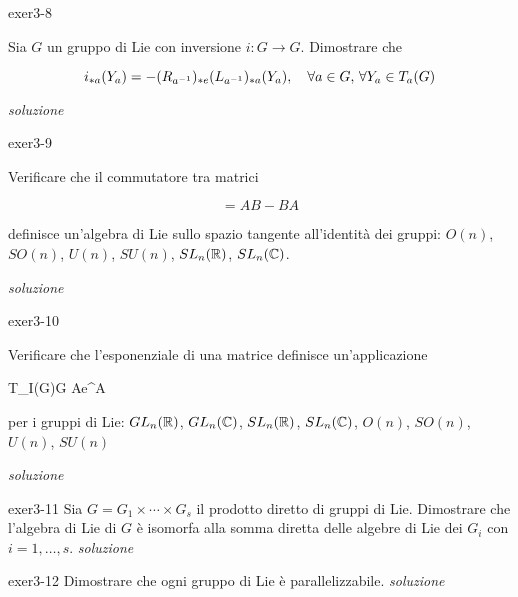 
{exer3-8}
{
Sia $ G $ un gruppo di Lie con inversione $ i : G \to G $. Dimostrare che

\begin{equation}
	i_{*a}(Y_{a}) = -(R_{a^{-1}})_{*e}(L_{a^{-1}})_{*a} (Y_{a}) %
	\qcomma \forall a \in G, \, \forall Y_{a} \in T_{a}(G)
\end{equation}
}
{
\textit{soluzione}
}


{exer3-9}
{
Verificare che il commutatore tra matrici

\begin{equation}
	[A,B] = AB - BA
\end{equation}

definisce un'algebra di Lie sullo spazio tangente all'identità dei gruppi: $ O(n) $, $ SO(n) $, $ U(n) $, $ SU(n) $, $ SL_{n}(\mathbb{R}) $, $ SL_{n}(\mathbb{C}) $.
}
{
\textit{soluzione}
}


{exer3-10}
{
Verificare che l'esponenziale di una matrice definisce un'applicazione

	{T_{I}(G)}{G}
	{A}{e^{A}}

per i gruppi di Lie: $ GL_{n}(\mathbb{R}) $, $ GL_{n}(\mathbb{C}) $, $ SL_{n}(\mathbb{R}) $, $ SL_{n}(\mathbb{C}) $, $ O(n) $, $ SO(n) $, $ U(n) $, $ SU(n) $
}
{
\textit{soluzione}
}


{exer3-11}
{
Sia $ G = G_{1} \times \cdots \times G_{s} $ il prodotto diretto di gruppi di Lie. Dimostrare che l'algebra di Lie di $ G $ è isomorfa alla somma diretta delle algebre di Lie dei $ G_{i} $ con $ i=1,\dots,s $.
}
{
\textit{soluzione}
}


{exer3-12}
{
Dimostrare che ogni gruppo di Lie è parallelizzabile.
}
{
\textit{soluzione}
}
